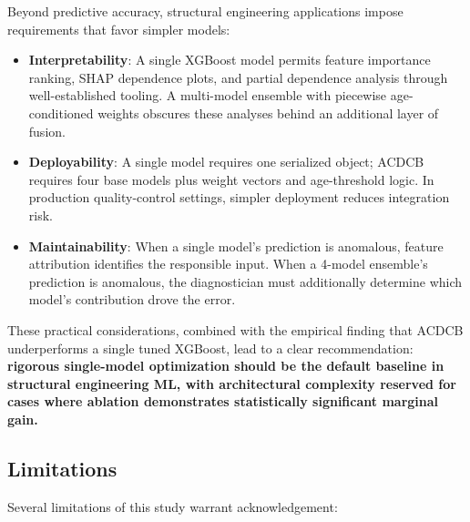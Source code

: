 \documentclass[journal]{IEEEtran}
\begin{document}
Beyond predictive accuracy, structural engineering applications impose requirements that favor simpler models:

\begin{itemize}
\item \textbf{Interpretability}: A single XGBoost model permits feature importance ranking, SHAP dependence plots, and partial dependence analysis through well-established tooling. A multi-model ensemble with piecewise age-conditioned weights obscures these analyses behind an additional layer of fusion.

\item \textbf{Deployability}: A single model requires one serialized object; ACDCB requires four base models plus weight vectors and age-threshold logic. In production quality-control settings, simpler deployment reduces integration risk.

\item \textbf{Maintainability}: When a single model's prediction is anomalous, feature attribution identifies the responsible input. When a 4-model ensemble's prediction is anomalous, the diagnostician must additionally determine which model's contribution drove the error.
\end{itemize}

These practical considerations, combined with the empirical finding that ACDCB underperforms a single tuned XGBoost, lead to a clear recommendation: \textbf{rigorous single-model optimization should be the default baseline in structural engineering ML, with architectural complexity reserved for cases where ablation demonstrates statistically significant marginal gain.}

\subsection{Limitations}

Several limitations of this study warrant acknowledgement:
\end{document}
